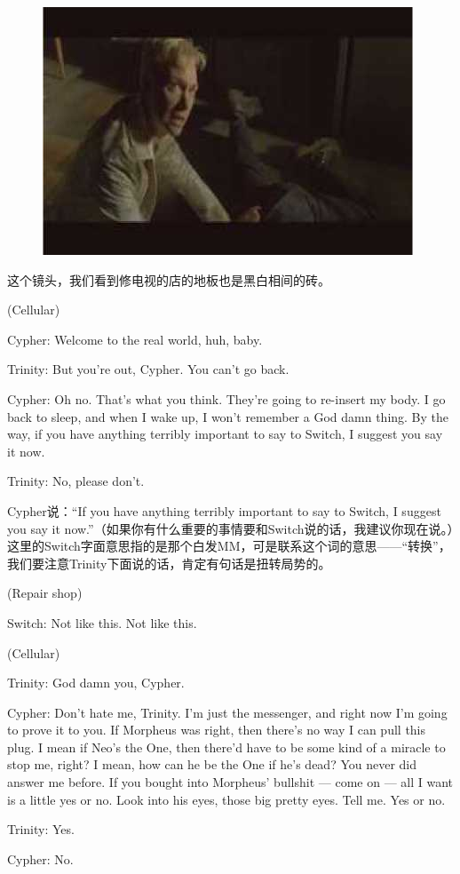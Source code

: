 \documentclass[UTF8]{ctexart}
\newenvironment{myquote}{\color{green} \setlength{\leftskip}{6em} \setlength{\rightskip}{4em} \setlength{\parindent}{-2em}}{\par}
\begin{document}
\begin{figure}[htb]
\centering
\includegraphics[width=0.5\linewidth]{fig/read_Matrix-59}
\end{figure}

这个镜头，我们看到修电视的店的地板也是黑白相间的砖。

\begin{myquote}
(Cellular)

Cypher: Welcome to the real world, huh, baby.

Trinity: But you're out, Cypher. You can't go back.

Cypher: Oh no. That's what you think. They're going to re-insert my body. I go back to sleep, and when I wake up, I won't remember a God damn thing. By the way, if you have anything terribly important to say to Switch, I suggest you say it now.

Trinity: No, please don't.
\end{myquote}

Cypher说：“If you have anything terribly important to say to Switch, I suggest you say it now.”（如果你有什么重要的事情要和Switch说的话，我建议你现在说。）这里的Switch字面意思指的是那个白发MM，可是联系这个词的意思——“转换”，我们要注意Trinity下面说的话，肯定有句话是扭转局势的。

\begin{myquote}
(Repair shop)

Switch: Not like this. Not like this.

(Cellular)

Trinity: God damn you, Cypher.

Cypher: Don't hate me, Trinity. I'm just the messenger, and right now I'm going to prove it to you. If Morpheus was right, then there's no way I can pull this plug. I mean if Neo's the One, then there'd have to be some kind of a miracle to stop me, right? I mean, how can he be the One if he's dead? You never did answer me before. If you bought into Morpheus' bullshit --- come on --- all I want is a little yes or no. Look into his eyes, those big pretty eyes. Tell me. Yes or no.

Trinity: Yes.

Cypher: No.
\end{myquote}
\end{document}

